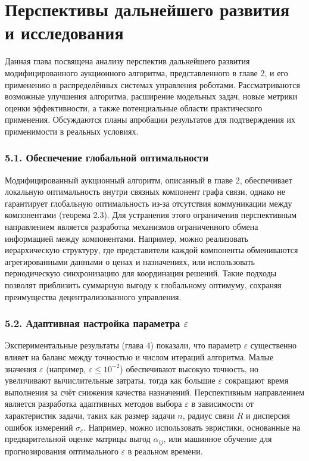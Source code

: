 \chapter{Перспективы дальнейшего развития и исследования}
\label{ch5}

Данная глава посвящена анализу перспектив дальнейшего развития модифицированного аукционного алгоритма, представленного в главе 2, и его применению в распределённых системах управления роботами. Рассматриваются возможные улучшения алгоритма, расширение модельных задач, новые метрики оценки эффективности, а также потенциальные области практического применения. Обсуждаются планы апробации результатов для подтверждения их применимости в реальных условиях.

\subsection*{5.1. Обеспечение глобальной оптимальности}
Модифицированный аукционный алгоритм, описанный в главе 2, обеспечивает локальную оптимальность внутри связных компонент графа связи, однако не гарантирует глобальную оптимальность из-за отсутствия коммуникации между компонентами (теорема 2.3). Для устранения этого ограничения перспективным направлением является разработка механизмов ограниченного обмена информацией между компонентами. Например, можно реализовать иерархическую структуру, где представители каждой компоненты обмениваются агрегированными данными о ценах и назначениях, или использовать периодическую синхронизацию для координации решений. Такие подходы позволят приблизить суммарную выгоду к глобальному оптимуму, сохраняя преимущества децентрализованного управления.

\subsection*{5.2. Адаптивная настройка параметра $\varepsilon$}
Экспериментальные результаты (глава 4) показали, что параметр $\varepsilon$ существенно влияет на баланс между точностью и числом итераций алгоритма. Малые значения $\varepsilon$ (например, $\varepsilon \leqslant 10^{-2}$) обеспечивают высокую точность, но увеличивают вычислительные затраты, тогда как большие $\varepsilon$ сокращают время выполнения за счёт снижения качества назначений. Перспективным направлением является разработка адаптивных методов выбора $\varepsilon$ в зависимости от характеристик задачи, таких как размер задачи $n$, радиус связи $R$ и дисперсия ошибок измерений $\sigma_c$. Например, можно использовать эвристики, основанные на предварительной оценке матрицы выгод $\alpha_{ij}$, или машинное обучение для прогнозирования оптимального $\varepsilon$ в реальном времени.

